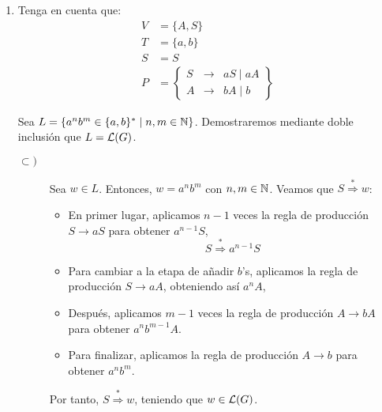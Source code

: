 \begin{ejercicio}
\begin{enumerate}
        \item Tenga en cuenta que:
        \begin{align*}
            V &= \{A,S\} \\
            T &= \{a,b\} \\
            S &= S \\
            P &= \left\{
                \begin{array}{rcl}
                    S &\rightarrow & aS \mid aA \\
                    A &\rightarrow & bA \mid b
                \end{array}
            \right\}
        \end{align*}

        Sea $L=\{a^nb^m \in \{a,b\}^\ast \mid n, m \in \mathbb{N}\}$. Demostraremos mediante doble inclusión que $L=\mathcal{L}(G)$.
        \begin{description}
            \item[$\subset)$] Sea $w\in L$. Entonces, $w=a^nb^m$ con $n,m\in \mathbb{N}$. Veamos que
            $S \stackrel{\ast}{\Longrightarrow} w$:
            \begin{itemize}
                \item En primer lugar, aplicamos $n-1$ veces la regla de producción $S \rightarrow aS$ para obtener $a^{n-1}S$,
                \begin{equation*}
                    S \stackrel{\ast}{\Longrightarrow} a^{n-1}S
                \end{equation*}

                \item Para cambiar a la etapa de añadir $b$'s, aplicamos la regla de producción $S \rightarrow aA$, obteniendo así $a^{n}A$,
                \item Después, aplicamos $m-1$ veces la regla de producción $A \rightarrow bA$ para obtener $a^nb^{m-1}A$.
                \item Para finalizar, aplicamos la regla de producción $A \rightarrow b$ para obtener $a^nb^m$.
            \end{itemize}
            Por tanto, $S \stackrel{\ast}{\Longrightarrow} w$, teniendo que $w\in \mathcal{L}(G)$.


\end{description}
\end{enumerate}
\end{ejercicio}
